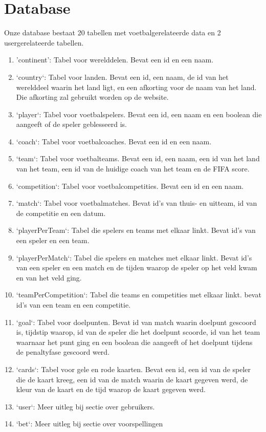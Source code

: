 \documentclass[11pt, a4paper]{article}
\begin{document}
\section{Database}
Onze database bestaat 20 tabellen met voetbalgerelateerde data en 2 usergerelateerde tabellen.
\begin{enumerate}
\item 'continent': Tabel voor werelddelen. Bevat een id en een naam.
\item `country`: Tabel voor landen. Bevat een id, een naam, de id van het werelddeel waarin het land ligt, en een afkorting voor de naam van het land. Die afkorting zal gebruikt worden op de website.
\item `player`: Tabel voor voetbalspelers. Bevat een id, een naam en een boolean die aangeeft of de speler geblesseerd is.
\item `coach`: Tabel voor voetbalcoaches. Bevat een id en een naam.
\item `team`: Tabel voor voetbalteams. Bevat een id, een naam, een id van het land van het team, een id van de huidige coach van het team en de FIFA score.
\item `competition`: Tabel voor voetbalcompetities. Bevat een id en een naam.
\item `match`: Tabel voor voetbalmatches. Bevat id's van thuis- en uitteam, id van de competitie en een datum.
\item `playerPerTeam`: Tabel die spelers en teams met elkaar linkt. Bevat id's van een speler en een team.
\item `playerPerMatch`: Tabel die spelers en matches met elkaar linkt. Bevat id's van een speler en een match en de tijden waarop de speler op het veld kwam en van het veld ging.
\item `teamPerCompetition`: Tabel die teams en competities met elkaar linkt. bevat id's van een team en een competitie.
\item `goal`: Tabel voor doelpunten. Bevat id van match waarin doelpunt gescoord is, tijdstip waarop, id van de speler die het doelpunt scoorde, id van het team waarnaar het punt ging en een boolean die aangeeft of het doelpunt tijdens de penaltyfase gescoord werd.
\item `cards`: Tabel voor gele en rode kaarten. Bevat een id, een id van de speler die de kaart kreeg, een id van de match waarin de kaart gegeven werd, de kleur van de kaart en de tijd waarop de kaart gegeven werd.
\item `user`: Meer uitleg bij sectie over gebruikers.
\item `bet`: Meer uitleg bij sectie over voorspellingen

\end{enumerate}
\end{document}
